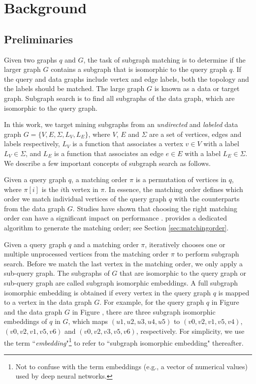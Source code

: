\section{Background}

\subsection{Preliminaries\label{sec:pre}}
Given two graphs $q$ and $G$, the task of subgraph matching is to determine if the larger graph $G$ contains a subgraph that is isomorphic
to the query graph $q$. If the query and data graphs include vertex and edge labels, both the topology and the labels should be matched.
The large graph $G$ is known as a data or target graph.  Subgraph search is to find all subgraphs  of the data graph, which are isomorphic
to the query graph.

In this work, we target mining subgraphs from an \emph{undirected} and \emph{labeled} data graph $G=\{V,E,\Sigma,L_V,L_E\}$, where $V$, $E$
and $\Sigma$ are a set of vertices, edges and labels respectively,  $L_V$ is a function that associates a vertex $v \in V$ with a label
$L_V \in \Sigma$, and $L_E$ is a function that associates an edge $e \in E$ with a label $L_E \in \Sigma$. We describe a few important concepts of subgraph search as follows.

 Given a query graph $q$, a matching order $\pi$ is a permutation of vertices in $q$, where $\pi[i]$ is the
$i$th vertex in $\pi$. In essence, the matching order defines which order we match individual vertices of the query graph $q$ with the
counterparts from the data graph $G$. Studies have shown that choosing the right matching order can have a significant impact on
performance \cite{bi2016efficient,sun2020subgraph,sun2020rapidmatch,guo2020gpu}.  \SystemName provides a dedicated algorithm to generate
the matching order; see Section \ref {sec:matchingorder}.

 Given a query graph $q$ and a matching order $\pi$, \SystemName iteratively chooses  one or multiple unprocessed
vertices from the matching order $\pi$ to perform subgraph search. Before we match the last vertex in the matching order, we only apply a
sub-query graph. The subgraphs of $G$ that are isomorphic to the query graph or sub-query graph are called subgraph isomorphic embeddings.
A full subgraph isomorphic embedding is obtained if every vertex in the query graph $q$ is mapped to a vertex in the data graph $G$. For
example, for the query graph $q$ in Figure  and the data graph $G$ in Figure , there are three subgraph isomorphic
embeddings of $q$ in $G$, which maps $(u1, u2, u3, u4, u5)$ to $(v0, v2, v1, v5, v4)$, $(v0, v2, v1, v5, v6)$ and $(v0, v2, v3, v5, v6)$,
respectively. For simplicity, we use the term ``\emph{embedding}"\footnote{Not to confuse with the term embeddings (e.g., a vector of
numerical values) used by deep neural networks.} to refer to ``subgraph isomorphic embedding" thereafter.


